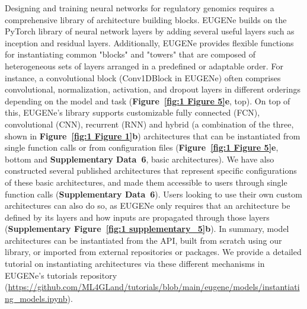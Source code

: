 Designing and training neural networks for regulatory genomics requires a comprehensive library of architecture building blocks. EUGENe builds on the PyTorch library of neural network layers by adding several useful layers such as inception and residual layers. Additionally, EUGENe provides flexible functions for instantiating common "blocks" and "towers" that are composed of heterogeneous sets of layers arranged in a predefined or adaptable order. For instance, a convolutional block (Conv1DBlock in EUGENe) often comprises convolutional, normalization, activation, and dropout layers in different orderings depending on the model and task (\textbf{Figure~\ref{fig:1 Figure 5}\textbf{e}}, top). On top of this, EUGENe’s library supports customizable fully connected (FCN), convolutional (CNN), recurrent (RNN) and hybrid (a combination of the three, shown in \textbf{Figure~\ref{fig:1 Figure 1}\textbf{b}}) architectures that can be instantiated from single function calls or from configuration files (\textbf{Figure~\ref{fig:1 Figure 5}\textbf{e}}, bottom and \textbf{Supplementary Data~6}, basic architectures). We have also constructed several published architectures that represent specific configurations of these basic architectures, and made them accessible to users through single function calls (\textbf{Supplementary Data~6}). Users looking to use their own custom architectures can also do so, as EUGENe only requires that an architecture be defined by its layers and how inputs are propagated through those layers (\textbf{Supplementary Figure~\ref{fig:1 supplementary_5}\textbf{b}}). In summary, model architectures can be instantiated from the API, built from scratch using our library, or imported from external repositories or packages. We provide a detailed tutorial on instantiating architectures via these different mechanisms in EUGENe’s tutorials repository (\url{https://github.com/ML4GLand/tutorials/blob/main/eugene/models/instantiating_models.ipynb}).

